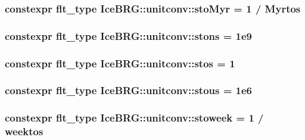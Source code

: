 \subsubsection[{sto\+Myr}]{\setlength{\rightskip}{0pt plus 5cm}constexpr {\bf flt\+\_\+type} Ice\+B\+R\+G\+::unitconv\+::sto\+Myr = 1 / {\bf Myrtos}}\label{namespaceIceBRG_1_1unitconv_a9f0f6ce103cd5bdd7d39eb0ce91bf5f9}
\hypertarget{namespaceIceBRG_1_1unitconv_a35cdeef295eb8f76dc1a1ee2210963e0}{}
\subsubsection[{stons}]{\setlength{\rightskip}{0pt plus 5cm}constexpr {\bf flt\+\_\+type} Ice\+B\+R\+G\+::unitconv\+::stons = 1e9}\label{namespaceIceBRG_1_1unitconv_a35cdeef295eb8f76dc1a1ee2210963e0}
\hypertarget{namespaceIceBRG_1_1unitconv_a9974944e490b1899879debccacb60a1e}{}
\subsubsection[{stos}]{\setlength{\rightskip}{0pt plus 5cm}constexpr {\bf flt\+\_\+type} Ice\+B\+R\+G\+::unitconv\+::stos = 1}\label{namespaceIceBRG_1_1unitconv_a9974944e490b1899879debccacb60a1e}
\hypertarget{namespaceIceBRG_1_1unitconv_a14b9598e88d781388ad487b065a86655}{}
\subsubsection[{stous}]{\setlength{\rightskip}{0pt plus 5cm}constexpr {\bf flt\+\_\+type} Ice\+B\+R\+G\+::unitconv\+::stous = 1e6}\label{namespaceIceBRG_1_1unitconv_a14b9598e88d781388ad487b065a86655}
\hypertarget{namespaceIceBRG_1_1unitconv_a7b5cbe2cd56245cd9cce8787cad2aa30}{}
\subsubsection[{stoweek}]{\setlength{\rightskip}{0pt plus 5cm}constexpr {\bf flt\+\_\+type} Ice\+B\+R\+G\+::unitconv\+::stoweek = 1 / {\bf weektos}}\label{namespaceIceBRG_1_1unitconv_a7b5cbe2cd56245cd9cce8787cad2aa30}
\hypertarget{namespaceIceBRG_1_1unitconv_a959f815670c89ca0c81221ee0221392b}{}
